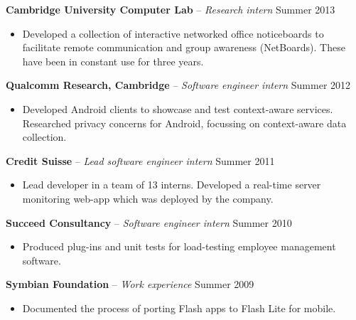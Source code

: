 \documentclass{article}
\begin{document}
\textbf{Cambridge University Computer Lab} -- \emph{Research intern} \hspace*{\fill} Summer
2013 \\[-6mm]
\begin{itemize}
  \item[]
  Developed a collection of interactive networked office noticeboards to facilitate remote communication and group awareness (NetBoards).
  These have been in constant use for three years.
\end{itemize} \smallskip

\textbf{Qualcomm Research, Cambridge} -- \emph{Software engineer intern} \hspace*{\fill} Summer
2012 \\[-6mm]
\begin{itemize}
  \item[] Developed Android clients to showcase and test context-aware services.
  Researched privacy concerns for Android, focussing on context-aware data collection.
\end{itemize} \smallskip

\textbf{Credit Suisse} -- \emph{Lead software engineer intern} \hfill Summer 2011 \\[-6mm]
\begin{itemize}
  \item[] Lead developer in a team of 13 interns. Developed a real-time server monitoring web-app which was deployed by the company.
\end{itemize} \smallskip

\textbf{Succeed Consultancy} -- \emph{Software engineer intern} \hfill Summer 2010 \\[-6mm]
\begin{itemize}
  \item[] Produced plug-ins and unit tests for load-testing employee management software.
\end{itemize} \smallskip

\textbf{Symbian Foundation} -- \emph{Work experience} \hfill Summer 2009 \\[-6mm]
\begin{itemize}
  \item[] Documented the process of porting Flash apps to Flash Lite for mobile.
\end{itemize} \smallskip
\end{document}
